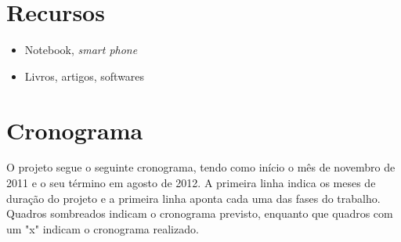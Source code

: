 \documentclass[diss]{template/setrem}
\begin{document}
\section{Recursos}
\begin{itemize}
	\item Notebook, \emph{smart phone}
	\item Livros, artigos, softwares
\end{itemize}

\section{Cronograma}
O projeto segue o seguinte cronograma, tendo como início o mês de novembro de 2011 e o seu término em agosto de 2012. A primeira linha indica os meses de duração do projeto e a primeira linha aponta cada uma das fases do trabalho. Quadros sombreados indicam o cronograma previsto, enquanto que quadros com um "x" indicam o cronograma realizado.
\end{document}
